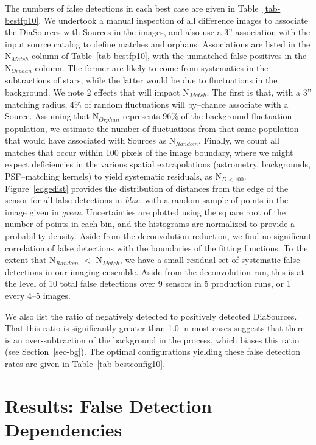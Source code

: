 \documentclass[prd, nofootinbib, floatfix, 11pt,tightenlines,times]{article}
\begin{document}
The numbers of false detections in each best case are given in
Table~\ref{tab-bestfp10}.  We undertook a manual inspection of all
difference images to associate the DiaSources with Sources in the
images, and also use a 3'' association with the input source catalog
to define matches and orphans.  Associations are listed in the
N$_{Match}$ column of Table~\ref{tab-bestfp10}, with the unmatched
false positives in the N$_{Orphan}$ column.  The former are likely to
come from systematics in the subtractions of stars, while the latter
would be due to fluctuations in the background.  We note 2 effects
that will impact N$_{Match}$.  The first is that, with a 3'' matching
radius, 4\% of random fluctuations will by--chance associate with a
Source.  Assuming that N$_{Orphan}$ represents 96\% of the background
fluctuation population, we estimate the number of fluctuations from
that same population that would have associated with Sources as
N$_{Random}$.  Finally, we count all matches that occur within 100
pixels of the image boundary, where we might expect deficiencies in
the various spatial extrapolations (astrometry, backgrounds,
PSF--matching kernels) to yield systematic residuals, as N$_{D<100}$.
Figure~\ref{edgedist} provides the distribution of distances from the
edge of the sensor for all false detections in {\it blue}, with a
random sample of points in the image given in {\it green}.
Uncertainties are plotted using the square root of the number of
points in each bin, and the histograms are normalized to provide a
probability density.  Aside from the deconvolution reduction, we find
no significant correlation of false detections with the boundaries of
the fitting functions.  To the extent that N$_{Random}$ $<$
N$_{Match}$, we have a small residual set of systematic false
detections in our imaging ensemble.  Aside from the deconvolution run,
this is at the level of 10 total false detections over 9 sensors in 5
production runs, or 1 every 4--5 images.

We also list the ratio of negatively detected to positively detected
DiaSources.  That this ratio is significantly greater than 1.0 in most
cases suggests that there is an over-subtraction of the background in
the process, which biases this ratio (see Section~\ref{sec-bg}).  The
optimal configurations yielding these false detection rates are given
in Table~\ref{tab-bestconfig10}.

\section{Results: False Detection Dependencies}
\end{document}
